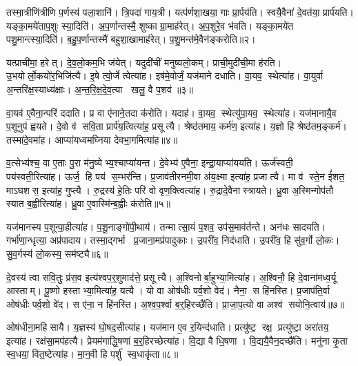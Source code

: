 तस्मा॒त्रीणि॑त्रीणि प॒र्णस्य॑ पला॒शानि॑। त्रि॒पदा॑ गाय॒त्री। यत्प॑र्णशा॒खया॒ गाः प्रा॒र्पय॑ति। स्वयै॒वैना॑ दे॒वत॑या॒ प्रार्प॑यति। यङ्का॒मये॑ताप॒शुः स्या॒दिति॑। अ॒प॒र्णान्तस्मै॒ शुष्काग्रा॒माह॑रेत्। अ॒प॒शुरे॒व भ॑वति। यङ्का॒मये॑त पशु॒मान्त्स्या॒दिति॑। ब॒हु॒प॒र्णान्तस्मै॑ बहुशा॒खामाह॑रेत्। प॒शु॒मन्त॑मे॒वैन॑ङ्करोति॥२।

यत्प्राची॑मा॒ हरेत्। दे॒व॒लो॒कम॒भि ज॑येत्। यदुदी॑चीं मनुष्यलो॒कम्। प्राची॒मुदी॑ची॒मा ह॑रति। उ॒भयोर्लो॒कयो॑र॒भिजि॑त्यै। इ॒षे त्वो॒र्जे त्वेत्या॑ह। इष॑मे॒वोर्जं॒ यज॑माने दधाति। वा॒यव॒ स्थेत्या॑ह। वा॒युर्वा अ॒न्तरि॑क्ष॒स्याध्य॑क्षाः। अ॒न्त॒रि॒क्ष॒दे॒व॒त्या खलु॒ वै प॒शव॑॥३॥

वा॒यव॑ ए॒वैना॒न्परि॑ ददाति। प्र वा ए॑नाने॒तदा क॑रोति। यदाह॑। वा॒यव॒ स्थेत्यु॑पा॒यव॒ स्थेत्या॑ह। यज॑मानायै॒व प॒शूनुप॑ ह्वयते। दे॒वो व॑ सवि॒ता प्रार्प॑य॒त्वित्या॑ह॒ प्रसूत्यै। श्रेष्ठ॑तमाय॒ कर्म॑ण॒ इत्या॑ह। य॒ज्ञो हि श्रेष्ठ॑तम॒ङ्कर्म॑। तस्मा॑दे॒वमा॑ह। आप्या॑यध्वमघ्निया देवभा॒गमित्या॑ह॥४॥

व॒त्सेभ्य॑श्च॒ वा ए॒ताः पु॒रा म॑नु॒ष्येभ्य॒श्चाप्या॑यन्त। दे॒वेभ्य॑ ए॒वैना॒ इन्द्रा॒याप्या॑ययति। ऊर्ज॑स्वती॒ पय॑स्वती॒रित्या॑ह। ऊर्ज॒ हि पय॑ स॒म्भर॑न्ति। प्र॒जाव॑तीरनमी॒वा अ॑य॒क्ष्मा इत्या॑ह॒ प्रजात्यै। मा व॑ स्ते॒न ई॑शत॒ माऽघशस॒ इत्या॑ह॒ गुप्त्यै। रु॒द्रस्य॑ हे॒तिः परि॑ वो वृण॒क्त्वित्या॑ह। रु॒द्रादे॒वैनास्त्रायते। ध्रु॒वा अ॒स्मिन्गोप॑तौ स्यात ब॒ह्वीरित्या॑ह। ध्रु॒वा ए॒वास्मि॑न्ब॒ह्वीः क॑रोति॥५॥

यज॑मानस्य प॒शून्पा॒हीत्या॑ह। प॒शू॒नाङ्गो॑पी॒थाय॑। तन्मात्सा॒यं प॒शव॒ उप॑स॒माव॑र्तन्ते। अन॑धः सादयति। गर्भा॑णा॒न्धृत्या॒ अप्र॑पादाय। तस्मा॒द्गर्भा प्र॒जाना॒मप्र॑पादुकाः। उ॒परी॑व॒ निद॑धाति। उ॒परी॑व॒ हि सु॑व॒र्गो लो॒कः। सु॒व॒र्गस्य॑ लो॒कस्य॒ सम॑ष्ट्यै॥६॥\anuvakamend[प॒शव॑ करोति प॒शवो॑ देवभा॒गमित्या॑ह करोति॒ नव॑ च]

दे॒वस्य॑ त्वा सवि॒तुः प्र॑स॒व इत्य॑श्वप॒र्॒शुमाद॑त्ते॒ प्रसूत्यै। अ॒श्विनोर्बा॒हुभ्या॒मित्या॑ह। अ॒श्विनौ॒ हि दे॒वाना॑मध्व॒र्यू आस्ताम्। पू॒ष्णो हस्ताभ्या॒मित्या॑ह॒ यत्यै। यो वा ओष॑धीः पर्व॒शो वेद॑। नैना॒ स हि॑नस्ति। प्र॒जाप॑ति॒र्वा ओष॑धीः पर्व॒शो वे॑द। स ए॑ना॒ न हि॑नस्ति। अ॒श्व॒प॒र्श्वा ब॒र्॒हिरच्छै॑ति। प्रा॒जा॒प॒त्यो वा अश्व॑ सयोनि॒त्वाय॑॥७॥

ओष॑धीना॒महिसायै। य॒ज्ञस्य॑ घो॒षद॒सीत्या॑ह। यज॑मान ए॒व र॒यिन्द॑धाति। प्रत्यु॑ष्ट॒ रक्ष॒ प्रत्यु॑ष्टा॒ अरा॑तय॒ इत्या॑ह। रक्ष॑सा॒मप॑हत्यै। प्रेयम॑गाद्धि॒षणा॑ ब॒र्॒हिरच्छेत्या॑ह। वि॒द्या वै धि॒षणा। वि॒द्ययै॒वैन॒दच्छै॑ति। मनु॑ना कृ॒ता स्व॒धया॒ वित॒ष्टेत्या॑ह। मा॒न॒वी हि पर्\mbox{}शु॑ स्व॒धाकृ॑ता॥८॥

